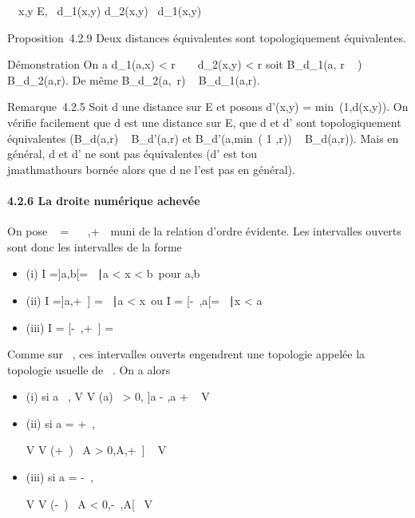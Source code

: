 \documentclass[]{article}
\begin{document}
\forall~~x,y \in E,\quad
\alpha~d_1(x,y) \leq d_2(x,y) \leq \beta~d_1(x,y)

Proposition~4.2.9 Deux distances équivalentes sont topologiquement
équivalentes.

Démonstration On a d_1(a,x) \textless{} r
\over \beta~ \rigtharrow~ d_2(x,y) \textless{} r soit
B_d_1(a, r \over \beta~ ) \subset~
B_d_2(a,r). De même B_d_2(a,\alpha~r) \subset~
B_d_1(a,r).

Remarque~4.2.5 Soit d une distance sur E et posons d'(x,y)
= min~(1,d(x,y)). On vérifie facilement que d
est une distance sur E, que d et d' sont topologiquement équivalentes
(B_d(a,r) \subset~ B_d'(a,r) et
B_d'(a,min~( 1  ,r)) \subset~ B_d(a,r)). Mais en général, d et d' ne sont pas
équivalentes (d' est tou\\jmathmathours bornée alors que d ne l'est pas en
général).

\paragraph{4.2.6 La droite numérique achevée}

On pose \overline{}~ = ~
\cup\-\infty~,+\infty~\ muni de la relation d'ordre
évidente. Les intervalles ouverts sont donc les intervalles de la forme

\begin{itemize}
\itemsep1pt\parskip0pt
\item
  (i) I ={]}a,b{[}= \x \in {}~∣a
  \textless{} x \textless{} b\ pour a,b
  \in\overline{}~
\item
  (ii) I ={]}a,+\infty~{]} = \x
  \in\overline{}~∣a
  \textless{} x\ ou I = {[}-\infty~,a{[}= \x
  \in\overline{}~∣x
  \textless{} a\
\item
  (iii) I = {[}-\infty~,+\infty~{]} = \overline{}~
\end{itemize}

Comme sur ~, ces intervalles ouverts engendrent une topologie appelée la
topologie usuelle de \overline\mathbb{R}~. On a alors

\begin{itemize}
\item
  (i) si a \in {}~, V \in V (a) \Leftrightarrow
  \exists~\epsilon \textgreater{} 0,\quad
  {]}a - \epsilon,a + \epsilon{[}\subset~ V
\item
  (ii) si a = +\infty~,

  V \in V (+\infty~) \Leftrightarrow \exists~A
  \textgreater{} 0,\quad {]}A,+\infty~{]} \subset~ V
\item
  (iii) si a = -\infty~,

  V \in V (-\infty~) \Leftrightarrow \exists~A
  \textless{} 0,\quad {[}-\infty~,A{[}\subset~ V
\end{itemize}
\end{document}
